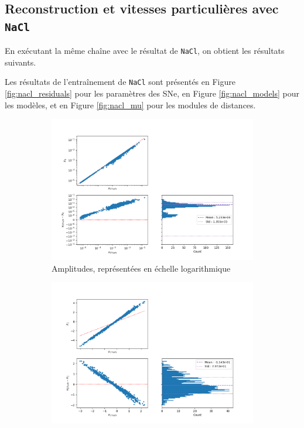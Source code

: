 \documentclass{book}
\def\nacl{\texttt{NaCl}\xspace}
\begin{document}
\subsection{Reconstruction et vitesses particulières avec \nacl}
En exécutant la même chaîne avec le résultat de \nacl, on obtient les résultats suivants.

Les résultats de l'entraînement de \nacl sont présentés en Figure \ref{fig:nacl_residuals} pour les paramètres des SNe, en Figure \ref{fig:nacl_models} pour les modèles, et en Figure \ref{fig:nacl_mu} pour les modules de distances.

\begin{figure}[h]
	\centering
	\begin{subfigure}{0.45\textwidth}
		\centering
		\includegraphics[width=\textwidth]{figures/nacl_x0.png}
		\caption{Amplitudes, représentées en échelle logarithmique}
		\label{fig:nacl_x0}
	\end{subfigure}
	\hfill
	\begin{subfigure}{0.45\textwidth}
		\centering
		\includegraphics[width=\textwidth]{figures/nacl_x1.png}

\end{subfigure}
\end{figure}
\end{document}
